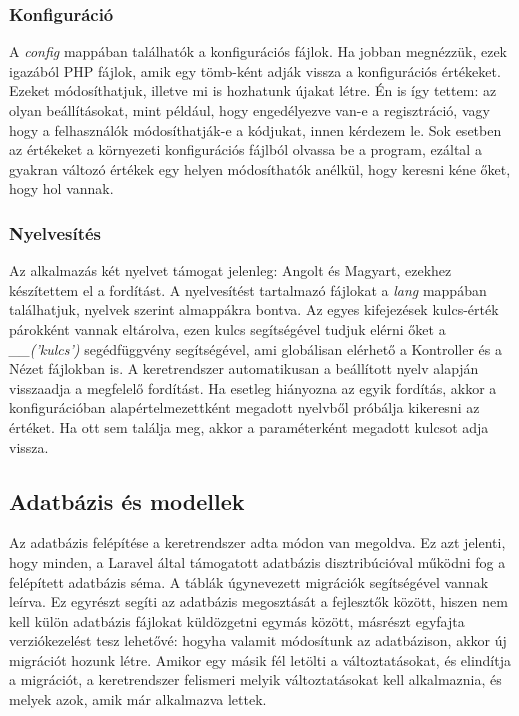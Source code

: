 \documentclass[
]{thesis-ekf}
\theoremstyle{definition}
\theoremstyle{remark}
\begin{document}
\subsubsection{Konfiguráció}

A \emph{config} mappában találhatók a konfigurációs fájlok. Ha jobban megnézzük, ezek igazából PHP fájlok, amik egy tömb-ként adják vissza a konfigurációs értékeket. Ezeket módosíthatjuk, illetve mi is hozhatunk újakat létre. Én is így tettem: az olyan beállításokat, mint például, hogy engedélyezve van-e a regisztráció, vagy hogy a felhasználók módosíthatják-e a kódjukat, innen kérdezem le. Sok esetben az értékeket a környezeti konfigurációs fájlból olvassa be a program, ezáltal a gyakran változó értékek egy helyen módosíthatók anélkül, hogy keresni kéne őket, hogy hol vannak.

\subsubsection{Nyelvesítés}

Az alkalmazás két nyelvet támogat jelenleg: Angolt és Magyart, ezekhez készítettem el a fordítást. A nyelvesítést tartalmazó fájlokat a \emph{lang} mappában találhatjuk, nyelvek szerint almappákra bontva. Az egyes kifejezések kulcs-érték párokként vannak eltárolva, ezen kulcs segítségével tudjuk elérni őket a \emph{\_\_('kulcs')} segédfüggvény segítségével, ami globálisan elérhető a Kontroller és a Nézet fájlokban is. A keretrendszer automatikusan a beállított nyelv alapján visszaadja a megfelelő fordítást. Ha esetleg hiányozna az egyik fordítás, akkor a konfigurációban alapértelmezettként megadott nyelvből próbálja kikeresni az értéket. Ha ott sem találja meg, akkor a paraméterként megadott kulcsot adja vissza.

\subsection{Adatbázis és modellek}

Az adatbázis felépítése a keretrendszer adta módon van megoldva. Ez azt jelenti, hogy minden, a Laravel által támogatott adatbázis disztribúcióval működni fog a felépített adatbázis séma. A táblák úgynevezett migrációk segítségével vannak leírva. Ez egyrészt segíti az adatbázis megosztását a fejlesztők között, hiszen nem kell külön adatbázis fájlokat küldözgetni egymás között, másrészt egyfajta verziókezelést tesz lehetővé: hogyha valamit módosítunk az adatbázison, akkor új migrációt hozunk létre. Amikor egy másik fél letölti a változtatásokat, és elindítja a migrációt, a keretrendszer felismeri melyik változtatásokat kell alkalmaznia, és melyek azok, amik már alkalmazva lettek.\cite{migrations}
\end{document}
